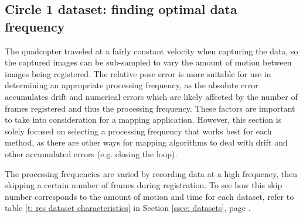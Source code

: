 \documentclass[12pt,a4paper]{article}
\begin{document}
  \subsection{Circle 1 dataset: finding optimal data frequency}
    \label{ssec: res freq}
    The quadcopter traveled at a fairly constant velocity when capturing the data, so the captured images can be sub-sampled to vary the amount of motion between images being registered. The relative pose error is more suitable for use in determining an appropriate processing frequency, as the absolute error accumulates drift and numerical errors which are likely affected by the number of frames registered and thus the processing frequency. These factors are important to take into consideration for a mapping application. However, this section is solely focused on selecting a processing frequency that works best for each method, as there are other ways for mapping algorithms to deal with drift and other accumulated errors (e.g. closing the loop).
     
    The processing frequencies are varied by recording data at a high frequency, then skipping a certain number of frames during registration. To see how this skip number corresponds to the amount of motion and time for each dataset, refer to table \ref{t: res dataset characteristics} in Section \ref{ssec: datasets}, page \pageref{t: res dataset characteristics}. 
\end{document}

